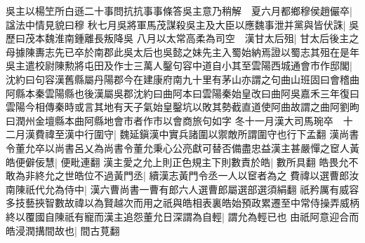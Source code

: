 吳主以楊笁所白遜二十事問抗抗事事條答吳主意乃稍解　夏六月都鄉穆侯趙儼卒|{
	諡法中情見貌曰穆}
秋七月吳將軍馬茂謀殺吳主及大臣以應魏事泄并黨與皆伏誅|{
	吳歷曰茂本魏淮南鍾離長叛降吳}
八月以太常高柔為司空　漢甘太后殂|{
	甘太后後主之母據陳夀志先已卒於南郡此吳太后也吳懿之妹先主入蜀始納焉證以蜀志其殂在是年}
吳主遣校尉陳勲將屯田及作士三萬人鑿句容中道自小其至雲陽西城通會市作邸閣|{
	沈約曰句容漢舊縣屬丹陽郡今在建康府南九十里有茅山亦謂之句曲山班固曰會稽曲阿縣本秦雲陽縣也後漢屬吳郡沈約曰曲阿本曰雲陽秦始皇改曰曲阿吳嘉禾三年復曰雲陽今相傳秦時或言其地有天子氣始皇鑿坑以敗其勢截直道使阿曲故謂之曲阿劉昫曰潤州金壇縣本曲阿縣地會市者作市以會商旅句如字}
冬十一月漢大司馬琬卒　十二月漢費禕至漢中行圍守|{
	魏延鎭漢中實兵諸圍以禦敵所謂圍守也行下孟翻}
漢尚書令董允卒以尚書呂乂為尚書令董允秉心公亮獻可替否備盡忠益漢主甚嚴憚之䆠人黃皓便僻佞慧|{
	便毗連翻}
漢主愛之允上則正色規主下則數責於皓|{
	數所具翻}
皓畏允不敢為非終允之世皓位不過黃門丞|{
	續漢志黃門令丞一人以䆠者為之}
費禕以選曹郎汝南陳祇代允為侍中|{
	漢六曹尚書一曹有郎六人選曹郎屬選部選須絹翻}
祇矜厲有威容多技藝挾智數故禕以為賢越次而用之祇與皓相表裏皓始預政累遷至中常侍操弄威柄終以覆國自陳祇有寵而漢主追怨董允日深謂為自輕|{
	謂允為輕已也}
由祇阿意迎合而皓浸潤搆間故也|{
	間古莧翻}


